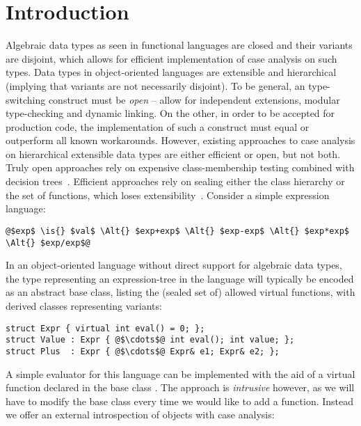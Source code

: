 \section{Introduction} %
\label{sec:intro}


Algebraic data types as seen in functional languages are closed and their 
variants are disjoint, which allows for efficient implementation of case analysis 
on such types. Data types in object-oriented languages are extensible
and hierarchical (implying that variants are not necessarily 
disjoint). 
To be general, an type-switching construct must be \emph{open} -- 
allow for independent extensions, modular type-checking and dynamic linking. 
On the other, in order to be accepted for production code, the implementation of
such a construct must equal or outperform all known workarounds. However, 
existing approaches to case analysis on hierarchical extensible data types are 
either efficient or open, but not both.
Truly open approaches rely on expensive class-membership testing combined with 
decision trees~\cite{}. Efficient approaches rely on sealing either the class 
hierarchy or the set of functions, which loses 
extensibility~\cite{Cohen91,DesignPatterns1993,Vitek97,PQEncoding}.  
Consider a simple expression language: 

\begin{lstlisting}
@$exp$ \is{} $val$ \Alt{} $exp+exp$ \Alt{} $exp-exp$ \Alt{} $exp*exp$ \Alt{} $exp/exp$@
\end{lstlisting}

\noindent 
In an object-oriented language without direct support for algebraic data types, 
the type representing an expression-tree in the language will typically be 
encoded as an abstract base class, listing the (sealed set of) allowed virtual 
functions, with derived classes representing variants:

\begin{lstlisting}[keepspaces,columns=flexible]
struct Expr { virtual int eval() = 0; };
struct Value : Expr { @$\cdots$@ int eval(); int value; };
struct Plus  : Expr { @$\cdots$@ Expr& e1; Expr& e2; };
\end{lstlisting}

\noindent
A simple evaluator for this language can be implemented with the aid of a
virtual function  declared in the base class . 
The approach is \emph{intrusive} however, as we will have to modify the base class every 
time we would like to add a function. 
Instead we offer an external introspection of objects with case analysis:

